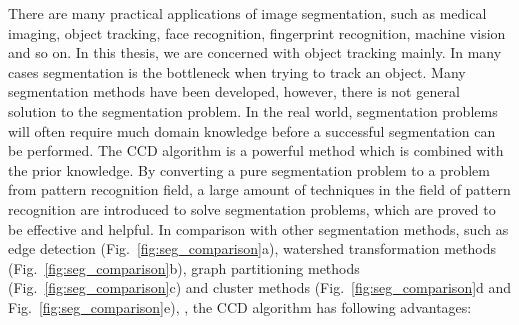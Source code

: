 There are many practical
applications of image segmentation, such as medical imaging, object
tracking, face recognition, fingerprint recognition, machine vision and
so on. In this thesis, we are concerned with object tracking mainly.
In many cases segmentation is the bottleneck when trying to track an
object. Many segmentation methods have been developed, however, there is not
general solution to the segmentation problem. In the real world,
segmentation problems will often require much domain knowledge before
a successful segmentation can be performed. The CCD algorithm is a
powerful method which is combined with the prior knowledge. By
converting a pure segmentation problem to a problem from pattern
recognition field, a large amount of techniques in the field of pattern
recognition are introduced to solve segmentation problems, which are
proved to be effective and helpful. In comparison with other segmentation
methods, such as
edge detection (Fig.~\ref{fig:seg_comparison}a), watershed
transformation methods (Fig.~\ref{fig:seg_comparison}b), graph
partitioning methods (Fig.~\ref{fig:seg_comparison}c)
and cluster methods (Fig.~\ref{fig:seg_comparison}d and Fig.~\ref{fig:seg_comparison}e),
, the CCD algorithm has following advantages:
